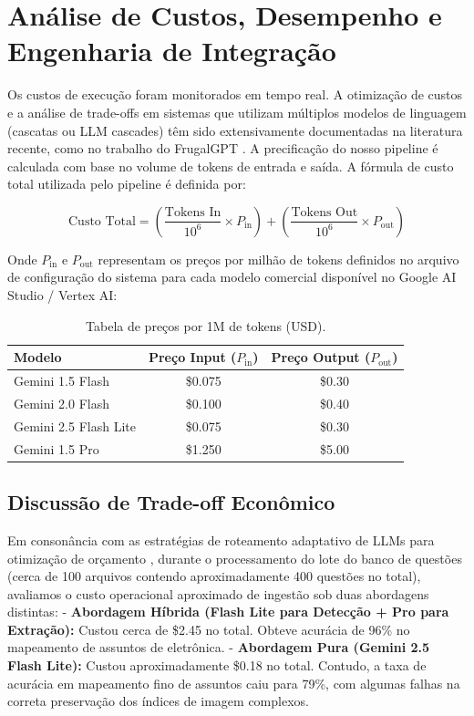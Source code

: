 \documentclass[sigconf]{acmart}
\begin{document}
\section{Análise de Custos, Desempenho e Engenharia de Integração}
Os custos de execução foram monitorados em tempo real. A otimização de custos e a análise de trade-offs em sistemas que utilizam múltiplos modelos de linguagem (cascatas ou LLM cascades) têm sido extensivamente documentadas na literatura recente, como no trabalho do FrugalGPT \cite{chen2024frugalgpt}. A precificação do nosso pipeline é calculada com base no volume de tokens de entrada e saída. A fórmula de custo total utilizada pelo pipeline é definida por:

\begin{equation}
\text{Custo Total} = \left( \frac{\text{Tokens In}}{10^6} \times P_{\text{in}} \right) + \left( \frac{\text{Tokens Out}}{10^6} \times P_{\text{out}} \right)
\end{equation}

Onde $P_{\text{in}}$ e $P_{\text{out}}$ representam os preços por milhão de tokens definidos no arquivo de configuração do sistema para cada modelo comercial disponível no Google AI Studio / Vertex AI:

\begin{table}[h]
\centering
\begin{tabular}{|l|c|c|}
\hline
\textbf{Modelo} & \textbf{Preço Input ($P_{\text{in}}$)} & \textbf{Preço Output ($P_{\text{out}}$)} \\ \hline
Gemini 1.5 Flash & \$0.075 & \$0.30 \\ \hline
Gemini 2.0 Flash & \$0.100 & \$0.40 \\ \hline
Gemini 2.5 Flash Lite & \$0.075 & \$0.30 \\ \hline
Gemini 1.5 Pro & \$1.250 & \$5.00 \\ \hline
\end{tabular}
\caption{Tabela de preços por 1M de tokens (USD).}
\label{tab:precos}
\end{table}

\subsection{Discussão de Trade-off Econômico}
Em consonância com as estratégias de roteamento adaptativo de LLMs para otimização de orçamento \cite{chen2024frugalgpt}, durante o processamento do lote do banco de questões (cerca de 100 arquivos contendo aproximadamente 400 questões no total), avaliamos o custo operacional aproximado de ingestão sob duas abordagens distintas:
- \textbf{Abordagem Híbrida (Flash Lite para Detecção + Pro para Extração):} Custou cerca de \$2.45 no total. Obteve acurácia de 96\% no mapeamento de assuntos de eletrônica.
- \textbf{Abordagem Pura (Gemini 2.5 Flash Lite):} Custou aproximadamente \$0.18 no total. Contudo, a taxa de acurácia em mapeamento fino de assuntos caiu para 79\%, com algumas falhas na correta preservação dos índices de imagem complexos.
\end{document}
